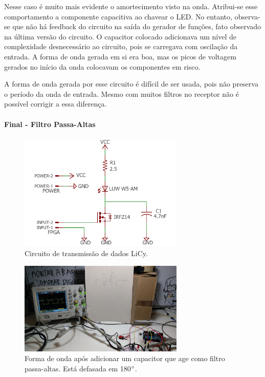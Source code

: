 		Nesse caso é muito mais evidente o amortecimento visto na onda. Atribui-se esse comportamento a componente capacitiva ao chavear o LED. No entanto, observa-se que não há feedback do circuito na saída do gerador de funções, fato observado na última versão do circuito. O capacitor colocado adicionava um nível de complexidade desnecessário ao circuito, pois se carregava com oscilação da entrada. A forma de onda gerada em si era boa, mas os picos de voltagem gerados no início da onda colocavam os componentes em risco.
		
		A forma de onda gerada por esse circuito é difícil de ser usada, pois não preserva o período da onda de entrada. Mesmo com muitos filtros no receptor não é possível corrigir a essa diferença.
		
		\paragraph{Final - Filtro Passa-Altas}
				
		\begin{figure}[htb]
			\caption{\label{fig_transmitter_lify_circuit_final} Circuito de transmissão de dados LiCy.}
			\centering		%
			\includegraphics[width=0.7\textwidth, trim={2cm 0cm 2cm 0cm}, clip]{circuits/transmitter_lify.pdf}
		\end{figure}
		
		\begin{figure}[htb]
			\caption{\label{fig_transmitter_lify_circuit_final_r1} Forma de onda após adicionar um capacitor que age como filtro passa-altas. Está defasada em 180$\degree$. }
			\centering		%
			\includegraphics[width=0.7\textwidth, trim={5cm 30cm 20cm 20cm}, clip]{circuits/photos/TX_200k_with_filter.jpeg}
		\end{figure}

